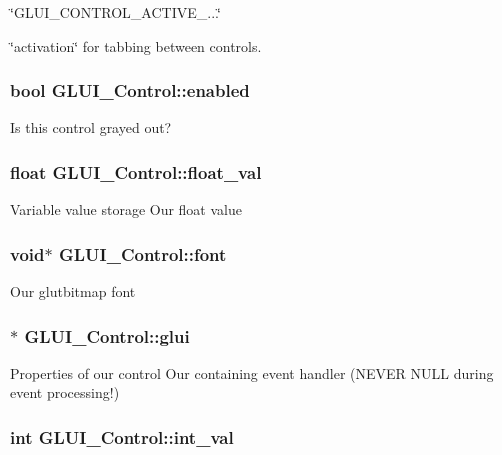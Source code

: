 \char`\"{}\-G\-L\-U\-I\-\_\-\-C\-O\-N\-T\-R\-O\-L\-\_\-\-A\-C\-T\-I\-V\-E\-\_\-...\char`\"{} 

\char`\"{}activation\char`\"{} for tabbing between controls. \hypertarget{classGLUI__Control_a834202682d00a31a2141eae6709d37e1}{
\subsubsection[{enabled}]{\setlength{\rightskip}{0pt plus 5cm}bool G\-L\-U\-I\-\_\-\-Control\-::enabled}}\label{classGLUI__Control_a834202682d00a31a2141eae6709d37e1}
Is this control grayed out? \hypertarget{classGLUI__Control_ac69b8e62a6f4f16c83b70a64f73d7a1c}{
\subsubsection[{float\-\_\-val}]{\setlength{\rightskip}{0pt plus 5cm}float G\-L\-U\-I\-\_\-\-Control\-::float\-\_\-val}}\label{classGLUI__Control_ac69b8e62a6f4f16c83b70a64f73d7a1c}
Variable value storage Our float value \hypertarget{classGLUI__Control_a132273406b5ea6d95cd26501fc2f2027}{
\subsubsection[{font}]{\setlength{\rightskip}{0pt plus 5cm}void$\ast$ G\-L\-U\-I\-\_\-\-Control\-::font}}\label{classGLUI__Control_a132273406b5ea6d95cd26501fc2f2027}
Our glutbitmap font \hypertarget{classGLUI__Control_ac731aebe26d7eb0b916a9692229f0eb6}{
\subsubsection[{glui}]{$\ast$ G\-L\-U\-I\-\_\-\-Control\-::glui}}\label{classGLUI__Control_ac731aebe26d7eb0b916a9692229f0eb6}
Properties of our control Our containing event handler (N\-E\-V\-E\-R N\-U\-L\-L during event processing!) \hypertarget{classGLUI__Control_a4a890b5b5a854b34200b5e63f1069b4e}{
\subsubsection[{int\-\_\-val}]{\setlength{\rightskip}{0pt plus 5cm}int G\-L\-U\-I\-\_\-\-Control\-::int\-\_\-val}}\label{classGLUI__Control_a4a890b5b5a854b34200b5e63f1069b4e}
